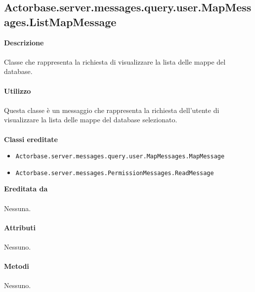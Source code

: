 \documentclass[a4paper]{article}
\begin{document}
	\subsection{Actorbase.server.messages.query.user.MapMessages.ListMapMessage}
		\textbf{Descrizione}
			\\ \\
		Classe che rappresenta la richiesta di visualizzare la lista delle mappe del database.
			\\ \\
		\textbf{Utilizzo}
			\\ \\
		Questa classe è un messaggio che rappresenta la richiesta dell'utente di visualizzare la lista delle mappe del database selezionato.
			\\ \\
		\textbf{Classi ereditate}
			\begin{itemize}
				\item \texttt{Actorbase.server.messages.query.user.MapMessages.MapMessage }
				\item \texttt{Actorbase.server.messages.PermissionMessages.ReadMessage }
			\end{itemize}
		\textbf{Ereditata da}
			\\ \\
			Nessuna.
			\\ \\
		\textbf{Attributi}
			\\ \\
			Nessuno.
			\\ \\
		\textbf{Metodi }
			\\ \\
			Nessuno.
			
\end{document}
